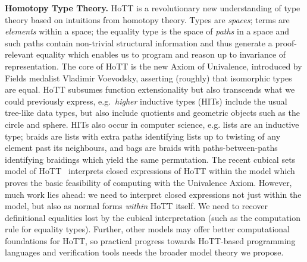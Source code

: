 \documentclass[a4paper,11pt]{article}
\begin{document}



{\bf Homotopy Type Theory.} HoTT is a revolutionary new understanding of
type theory based on intuitions from homotopy theory. Types are
\emph{spaces}; terms are \emph{elements} within a space; the equality
type is the space of \emph{paths} in a space and such paths contain
non-trivial structural information and thus generate a proof-relevant
equality which enables us to program and reason up to invariance of
representation. The core of HoTT is the new Axiom of Univalence,
introduced by Fields medalist Vladimir Voevodsky, asserting (roughly)
that isomorphic types are equal. HoTT subsumes function extensionality
but also transcends what we could previously express, e.g.\
\emph{higher} inductive types (HITs) include the usual tree-like data
types, but also include quotients \cite{alti:mpc04} and geometric
objects such as the circle and sphere. HITs also occur in computer
science, e.g. lists are an inductive type; braids are lists with extra
paths identifying lists up to twisting of any element past its
neighbours, and bags are braids with paths-between-paths identifying
braidings which yield the same permutation. The recent cubical sets
model of HoTT~\cite{BezemM:cubsmt} interprets closed expressions of
HoTT within the model which proves the basic feasibility of computing
with the Univalence Axiom. However, much work lies ahead: we need to
interpret closed expressions not just within the model, but also as
normal forms \emph{within} HoTT itself. We need to recover
definitional equalities lost by the cubical interpretation (such as
the computation rule for equality types). Further, other models may
offer better computational foundations for HoTT, so practical progress
towards HoTT-based programming languages and verification tools needs
the broader model theory we propose.



\end{document}
